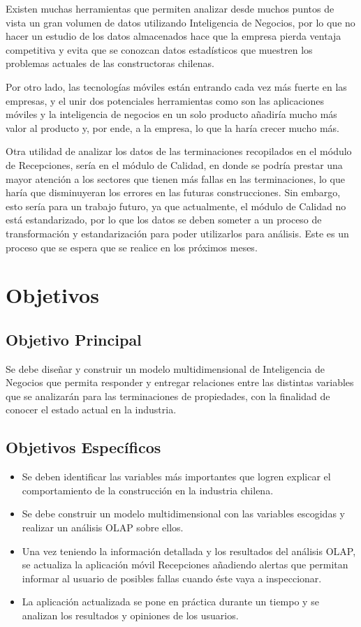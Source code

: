 \documentclass[letter,12pt,oneside]{report}
\begin{document}
Existen muchas herramientas que permiten analizar desde muchos puntos de vista un gran volumen de datos utilizando Inteligencia de Negocios, por lo que no hacer un estudio de los datos almacenados hace que la empresa pierda ventaja competitiva y evita que se conozcan datos estadísticos que muestren los problemas actuales de las constructoras chilenas.

Por otro lado, las tecnologías móviles están entrando cada vez más fuerte en las empresas, y el unir dos potenciales herramientas como son las aplicaciones móviles y la inteligencia de negocios en un solo producto añadiría mucho más valor al producto y, por ende, a la empresa, lo que la haría crecer mucho más.

Otra utilidad de analizar los datos de las terminaciones recopilados en el módulo de Recepciones, sería en el módulo de Calidad, en donde se podría prestar una mayor atención a los sectores que tienen más fallas en las terminaciones, lo que haría que disminuyeran los errores en las futuras construcciones. Sin embargo, esto sería para un trabajo futuro, ya que actualmente, el módulo de Calidad no está estandarizado, por lo que los datos se deben someter a un proceso de transformación y estandarización para poder utilizarlos para análisis. Este es un proceso que se espera que se realice en los próximos meses.

\section{Objetivos}
\subsection{Objetivo Principal}
Se debe diseñar y construir un modelo multidimensional de Inteligencia de Negocios que permita responder y entregar relaciones entre las distintas variables que se analizarán para las terminaciones de propiedades, con la finalidad de conocer el estado actual en la industria.

\subsection{Objetivos Específicos}
\begin{itemize}
\item Se deben identificar las variables más importantes que logren explicar el comportamiento de la construcción en la industria chilena.
\item Se debe construir un modelo multidimensional con las variables escogidas y realizar un análisis OLAP sobre ellos.
\item Una vez teniendo la información detallada y los resultados del análisis OLAP, se actualiza la aplicación móvil Recepciones añadiendo alertas que permitan informar al usuario de posibles fallas cuando éste vaya a inspeccionar.
\item La aplicación actualizada se pone en práctica durante un tiempo y se analizan los resultados y opiniones de los usuarios.
\end{itemize}
\end{document}
